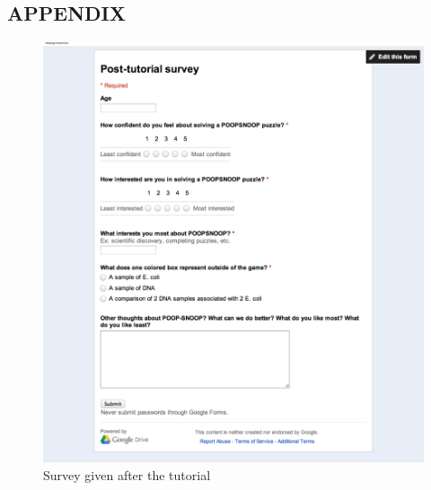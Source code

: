 \documentclass[12pt]{ucthesis}
\begin{document}
\pagestyle{plain}

\renewcommand{\baselinestretch}{1.66}












\clearpage
\nocite{*}
%


\begin{appendices}

\chapter*{APPENDIX}


{
   \captionsetup[figure]{labelformat=empty}

   \begin{figure}[H]
   \centering
   \includegraphics[width=115mm]{images/Post-tutorial.pdf}
   \caption[]{Survey given after the tutorial}
   \end{figure}

}
\end{appendices}
\end{document}
